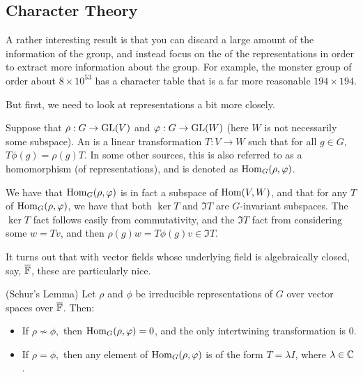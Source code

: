 \documentclass{article}
\begin{document}
\subsection{Character Theory}

A rather interesting result is that you can discard a large amount of the information of the group, and instead focus on the  of the representations in order to extract more information about the group. For example, the monster group of order about $8 \times 10^{53}$ has a character table that is a far more reasonable $194 \times 194$.

But first, we need to look at representations a bit more closely.

\begin{definition}
Suppose that $\rho : G \to \operatorname{GL}(V)$ and $\varphi : G \to \operatorname{GL}(W)$ (here $W$ is not necessarily some subspace). An  is a linear transformation $T : V \to W$ such that for all $g \in G$, $T\phi(g) = \rho(g)T$. In some other sources, this is also referred to as a homomorphism (of representations), and is denoted as $\operatorname{Hom}_G(\rho, \varphi)$.
\end{definition}

We have that $\operatorname{Hom}_G(\rho, \varphi)$ is in fact a subspace of $\operatorname{Hom}(V,W)$, and that for any $T$ of $\operatorname{Hom}_G(\rho,\varphi)$, we have that both $\ker T$ and $\Im T$ are $G$-invariant subspaces. The $\ker T$ fact follows easily from commutativity, and the $\Im T$ fact from considering some $w = Tv$, and then $\rho(g)w = T\phi(g)v \in \Im T$.

It turns out that with vector fields whose underlying field is algebraically closed, say, $\overline{\mathbb F}$, these are particularly nice.
\begin{theorem}
(Schur's Lemma) Let $\rho$ and $\phi$ be irreducible representations of $G$ over vector spaces over $\overline{\mathbb F}$. Then:
\begin{itemize}
    \item If $\rho \not\sim \phi,$ then $\operatorname{Hom}_G(\rho,\varphi) = 0$, and the only intertwining transformation is $0$.
    \item If $\rho = \phi,$ then any element of $\operatorname{Hom}_G(\rho,\varphi)$ is of the form $T=\lambda I$, where $\lambda \in \mathbb C$.
\end{itemize}
\end{theorem}
\end{document}
